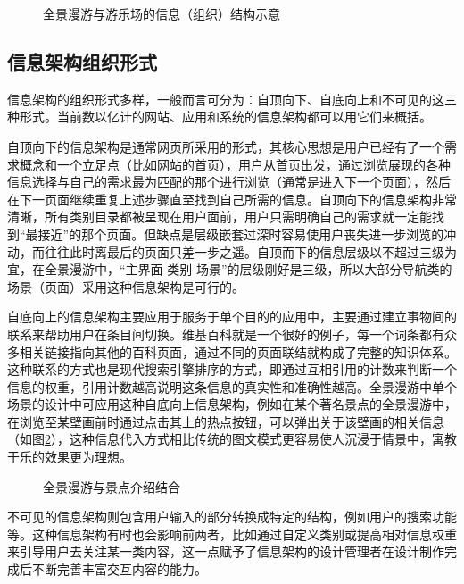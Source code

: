 \begin{figure}[htp]
\centering
{}
\caption{全景漫游与游乐场的信息（组织）结构示意}
\label{fig:park}
\end{figure}

\subsection{信息架构组织形式}
信息架构的组织形式多样，一般而言可分为：自顶向下、自底向上和不可见的这三种形式。当前数以亿计的网站、应用和系统的信息架构都可以用它们来概括。

自顶向下的信息架构是通常网页所采用的形式，其核心思想是用户已经有了一个需求概念和一个立足点（比如网站的首页），用户从首页出发，通过浏览展现的各种信息选择与自己的需求最为匹配的那个进行浏览（通常是进入下一个页面），然后在下一页面继续重复上述步骤直至找到自己所需的信息。自顶向下的信息架构非常清晰，所有类别目录都被呈现在用户面前，用户只需明确自己的需求就一定能找到“最接近”的那个页面。但缺点是层级嵌套过深时容易使用户丧失进一步浏览的冲动，而往往此时离最后的页面只差一步之遥。自顶而下的信息层级以不超过三级为宜，在全景漫游中，“主界面-类别-场景”的层级刚好是三级，所以大部分导航类的场景（页面）采用这种信息架构是可行的。

自底向上的信息架构主要应用于服务于单个目的的应用中，主要通过建立事物间的联系来帮助用户在条目间切换。维基百科就是一个很好的例子，每一个词条都有众多相关链接指向其他的百科页面，通过不同的页面联结就构成了完整的知识体系。这种联系的方式也是现代搜索引擎排序的方式，即通过互相引用的计数来判断一个信息的权重，引用计数越高说明这条信息的真实性和准确性越高。全景漫游中单个场景的设计中可应用这种自底向上信息架构，例如在某个著名景点的全景漫游中，在浏览至某壁画前时通过点击其上的热点按钮，可以弹出关于该壁画的相关信息（如图\ref{fig:dunhuang}），这种信息代入方式相比传统的图文模式更容易使人沉浸于情景中，寓教于乐的效果更为理想。

\begin{figure}[htp]
\centering
{}
\caption{全景漫游与景点介绍结合}
\label{fig:dunhuang}
\end{figure}

不可见的信息架构则包含用户输入的部分转换成特定的结构，例如用户的搜索功能等。这种信息架构有时也会影响前两者，比如通过自定义类别或提高相对信息权重来引导用户去关注某一类内容，这一点赋予了信息架构的设计管理者在设计制作完成后不断完善丰富交互内容的能力。

